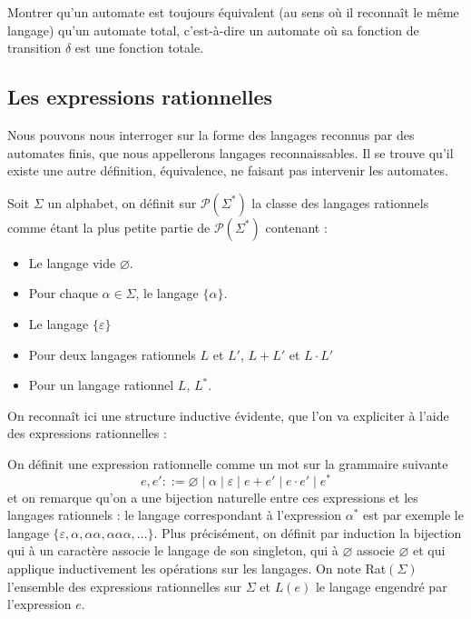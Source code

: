  \begin{exo}
     Montrer qu'un automate est toujours équivalent (au sens où il reconnaît le même langage) qu'un automate total, c'est-à-dire un automate où sa fonction de transition $\delta$ est une fonction totale.
 \end{exo}

 \subsection{Les expressions rationnelles}

 Nous pouvons nous interroger sur la forme des langages reconnus par des automates finis, que nous appellerons langages reconnaissables. Il se trouve qu'il existe une autre définition, équivalence, ne faisant pas intervenir les automates.

 \begin{defi}
     Soit $\Sigma$ un alphabet, on définit sur $\mathcal P(\Sigma^*)$ la classe des langages rationnels comme étant la plus petite partie de $\mathcal P(\Sigma^*)$ contenant :
     \begin{itemize}[label=$\bullet$]
         \item Le langage vide $\varnothing$.
         \item Pour chaque $\alpha\in\Sigma$, le langage $\{\alpha\}$.
         \item Le langage $\{\varepsilon\}$
         \item Pour deux langages rationnels $L$ et $L'$, $L + L'$ et $L\cdot L'$
         \item Pour un langage rationnel $L$, $L^*$.
     \end{itemize}
 \end{defi}
 
 On reconnaît ici une structure inductive évidente, que l'on va expliciter à l'aide des expressions rationnelles :

 \begin{defi}
     On définit une expression rationnelle comme un mot sur la grammaire suivante $$e,e' ::= \varnothing \mid \alpha \mid\varepsilon\mid e + e' \mid e \cdot e' \mid e^*$$ et on remarque qu'on a une bijection naturelle entre ces expressions et les langages rationnels : le langage correspondant à l'expression $\alpha^*$ est par exemple le langage $\{\varepsilon,\alpha,\alpha\alpha,\alpha\alpha\alpha,\ldots\}$. Plus précisément, on définit par induction la bijection qui à un caractère associe le langage de son singleton, qui à $\varnothing$ associe $\varnothing$ et qui applique inductivement les opérations sur les langages. On note Rat$(\Sigma)$ l'ensemble des expressions rationnelles sur $\Sigma$ et $L(e)$ le langage engendré par l'expression $e$.
 \end{defi}

